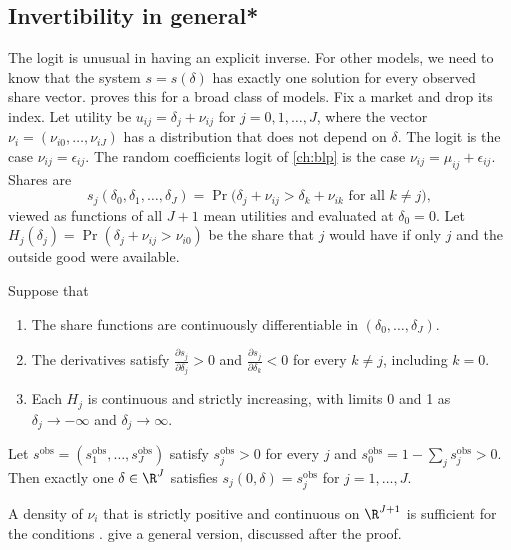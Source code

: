 \subsection{Invertibility in general*}\label{sec:07-invertibility}

The logit is unusual in having an explicit inverse. For other models, we need to know that the system $s =
s(\delta)$ has exactly one solution for every observed share vector. \citet[Appendix]{Berry1994} proves this
for a broad class of models. Fix a market and drop its index. Let utility be $u_{ij} = \delta_j + \nu_{ij}$ for
$j = 0, 1, \dots, J$, where the vector $\nu_i = (\nu_{i0}, \dots, \nu_{iJ})$ has a distribution that does not
depend on $\delta$. The logit is the case $\nu_{ij} = \epsilon_{ij}$. The random coefficients logit of
\cref{ch:blp} is the case $\nu_{ij} = \mu_{ij} + \epsilon_{ij}$. Shares are
\begin{equation}\label{eq:07-general-share}
  s_j(\delta_0, \delta_1, \dots, \delta_J) = \Pr\big(\delta_j + \nu_{ij} > \delta_k + \nu_{ik}
  \text{ for all } k \ne j\big),
\end{equation}
viewed as functions of all $J + 1$ mean utilities and evaluated at $\delta_0 = 0$. Let $H_j(\delta_j) =
\Pr(\delta_j + \nu_{ij} > \nu_{i0})$ be the share that $j$ would have if only $j$ and the outside good were
available.

\begin{proposition}\label{prop:07-invertibility}
Suppose that
\begin{enumerate}[label=(\alph*)]
  \item The share functions are continuously differentiable in $(\delta_0, \dots, \delta_J)$.
  \item The derivatives satisfy $\frac{\partial s_j}{\partial \delta_j} > 0$ and $\frac{\partial s_j}{\partial
  \delta_k} < 0$ for every $k \ne j$, including $k = 0$.
  \item Each $H_j$ is continuous and strictly increasing, with limits 0 and 1 as $\delta_j \to -\infty$ and
  $\delta_j \to \infty$.
\end{enumerate}
Let $s^{\mathrm{obs}} = (s^{\mathrm{obs}}_1, \dots, s^{\mathrm{obs}}_J)$ satisfy $s^{\mathrm{obs}}_j > 0$ for
every $j$ and $s^{\mathrm{obs}}_0 = 1 - \sum_j s^{\mathrm{obs}}_j > 0$. Then exactly one $\delta \in \R^J$
satisfies $s_j(0, \delta) = s^{\mathrm{obs}}_j$ for $j = 1, \dots, J$.
\end{proposition}

A density of $\nu_i$ that is strictly positive and continuous on $\R^{J+1}$ is sufficient for the conditions
\citep[p.~260]{Berry1994}.  give a general version, discussed after the proof.

